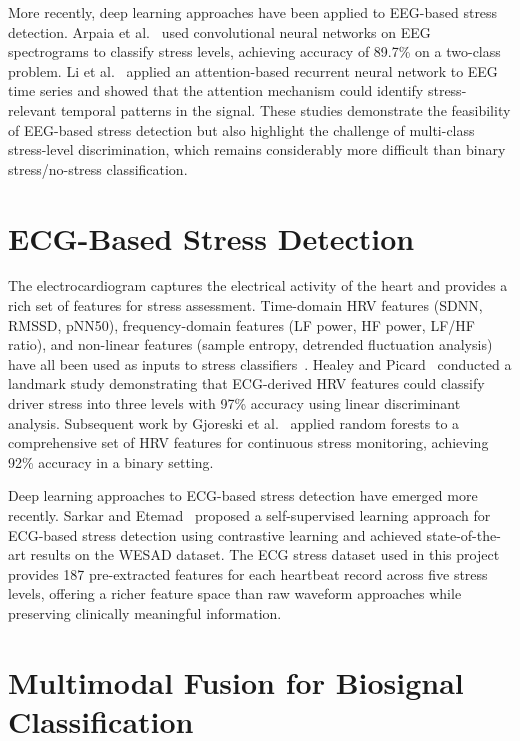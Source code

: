 \documentclass[12pt,letterpaper]{report}
\begin{document}
More recently, deep learning approaches have been applied to EEG-based stress detection. Arpaia et al.~\cite{arpaia2022} used convolutional neural networks on EEG spectrograms to classify stress levels, achieving accuracy of 89.7\% on a two-class problem. Li et al.~\cite{li2022} applied an attention-based recurrent neural network to EEG time series and showed that the attention mechanism could identify stress-relevant temporal patterns in the signal. These studies demonstrate the feasibility of EEG-based stress detection but also highlight the challenge of multi-class stress-level discrimination, which remains considerably more difficult than binary stress/no-stress classification.

\section{ECG-Based Stress Detection}
\label{sec:ecg_stress}

The electrocardiogram captures the electrical activity of the heart and provides a rich set of features for stress assessment. Time-domain HRV features (SDNN, RMSSD, pNN50), frequency-domain features (LF power, HF power, LF/HF ratio), and non-linear features (sample entropy, detrended fluctuation analysis) have all been used as inputs to stress classifiers~\cite{kim2018}. Healey and Picard~\cite{healey2005} conducted a landmark study demonstrating that ECG-derived HRV features could classify driver stress into three levels with 97\% accuracy using linear discriminant analysis. Subsequent work by Gjoreski et al.~\cite{gjoreski2017} applied random forests to a comprehensive set of HRV features for continuous stress monitoring, achieving 92\% accuracy in a binary setting.

Deep learning approaches to ECG-based stress detection have emerged more recently. Sarkar and Etemad~\cite{sarkar2020} proposed a self-supervised learning approach for ECG-based stress detection using contrastive learning and achieved state-of-the-art results on the WESAD dataset. The ECG stress dataset used in this project provides 187 pre-extracted features for each heartbeat record across five stress levels, offering a richer feature space than raw waveform approaches while preserving clinically meaningful information.

\section{Multimodal Fusion for Biosignal Classification}
\label{sec:multimodal}
\end{document}
